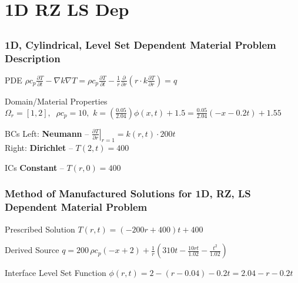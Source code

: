 \documentclass[]{beamer}
\begin{document}
\section{1D RZ LS Dep}
\subsection{}
\begin{frame}[t]\frametitle{1D, Cylindrical, Level Set Dependent Material Problem Description}
  \begin{block}{PDE}
    $\rho c_p\frac{\partial T}{\partial t} - \nabla k \nabla T = \rho c_p\frac{\partial T}{\partial t} - \frac{1}{r} \frac{\partial}{\partial r}\left(r\cdot k \frac{\partial T}{\partial r} \right) = q$
  \end{block}
  
  \begin{block}{Domain/Material Properties}
  	$\Omega_r = [1,2], \,\,\ \rho c_p = 10, \,\, k=\left(\frac{0.05}{2.04}\right) \phi(x,t) + 1.5
  	= \frac{0.05}{2.04}\left( - x - 0.2t\right) + 1.55$
  \end{block}
  
  \begin{block}{BCs}
    Left:  \textbf{Neumann} -- $\left. \frac{\partial T}{\partial r}\right|_{r=1} = k(r,t) \cdot 200t$ \\
    Right: \textbf{Dirichlet} -- $T(2,t) = 400$
  \end{block}
  
  \begin{block}{ICs}
    \textbf{Constant} -- $T(r,0) = 400$
  \end{block}
\end{frame}

\begin{frame}[t]\frametitle{Method of Manufactured Solutions for 1D, RZ, LS Dependent Material Problem}
  \begin{block}{Prescribed Solution}
    $T(r,t) = (-200r+400)t + 400$
  \end{block}
  
  \begin{block}{Derived Source}
  $q = 200\,\rho c_p \left(-x+2\right) + \frac{1}{r}\left( 310t - \frac{10rt}{1.02} - \frac{t^2}{1.02}\right)$
  \end{block}
  
  \begin{block}{Interface Level Set Function}
    $\phi(r,t) = 2 - (r - 0.04) - 0.2t = 2.04 - r - 0.2t$
  \end{block}
\end{frame}
\end{document}
